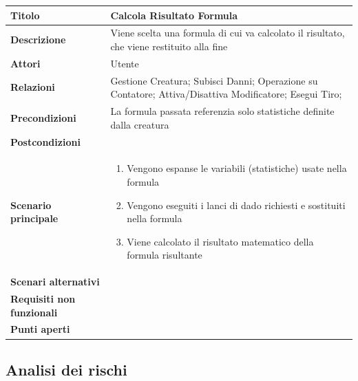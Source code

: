 \documentclass[a4paper, 11pt]{article}
\begin{document}
\begin{center}
\begin{tabular}{ |p{5cm}|p{9.5cm}|  }
\hline
\textbf{Titolo} & Calcola Risultato Formula \\
\hline
\textbf{Descrizione} & Viene scelta una formula di cui va calcolato il risultato, che viene restituito alla fine \\
\hline
\textbf{Attori} & Utente \\
\hline
\textbf{Relazioni} & Gestione Creatura; Subisci Danni; Operazione su Contatore; Attiva/Disattiva Modificatore; Esegui Tiro; \\
\hline
\textbf{Precondizioni} & La formula passata referenzia solo statistiche definite dalla creatura \\
\hline
\textbf{Postcondizioni} & \\
\hline
\textbf{Scenario principale} & 
\begin{enumerate}
    \item Vengono espanse le variabili (statistiche) usate nella formula
    \item Vengono eseguiti i lanci di dado richiesti e sostituiti nella formula
    \item Viene calcolato il risultato matematico della formula risultante
\end{enumerate}\\
\hline
\textbf{Scenari alternativi} &\\
\hline
\textbf{Requisiti non funzionali} & \\
\hline
\textbf{Punti aperti} & \\
\hline
\end{tabular}

\vspace{3em}

\end{center}

\newpage

\subsection{Analisi dei rischi}
\end{document}
